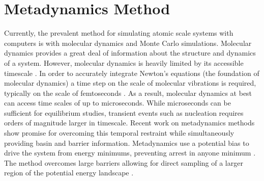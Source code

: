 \section{Metadynamics Method}
Currently, the prevalent method for simulating atomic scale systems with computers is with molecular dynamics and Monte Carlo simulations.  Molecular dynamics provides a great deal of information about the structure and dynamics of a system.  However, molecular dynamics is heavily limited by its accessible timescale \cite{Melorose2015}.  In order to accurately integrate Newton's equations (the foundation of molecular dynamics) a time step on the scale of molecular vibrations is required, typically on the scale of femtoseconds \cite{Melorose2015}.  As a result, molecular dynamics at best can access time scales of up to microseconds.  While microseconds can be sufficient for equilibrium studies, transient events such as nucleation requires orders of magnitude larger in timescale.  Recent work on metadynamics methods show promise for overcoming this temporal restraint while simultaneously providing basin and barrier information.  Metadynamics use a potential bias to drive the system from energy minimums, preventing arrest in anyone minimum \cite{Melorose2015}.  The method overcomes large barriers allowing for direct sampling of a larger region of the potential energy landscape \cite{Melorose2015}.

